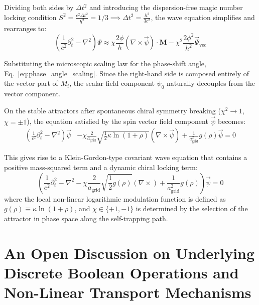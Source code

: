 \documentclass[12pt, a4paper]{article}
\begin{document}
Dividing both sides by $\Delta t^2$ and introducing the dispersion-free magic number locking condition $S^2 = \frac{c^2 \Delta t^2}{h^2} = 1/3 \implies \Delta t^2 = \frac{h^2}{3c^2}$, the wave equation simplifies and rearranges to:
\begin{equation}
\label{eq:simplified_wave_eq}
\left( \frac{1}{c^2} \partial_t^2 - \nabla^2 \right) \Psi \approx \chi \frac{2\phi}{h} \left( \nabla \times \vec{\psi} \right) \cdot \mathbf{M} - \chi^2 \frac{2\phi^2}{h^2} \vec{\Psi}_{\text{vec}}
\end{equation}

Substituting the microscopic scaling law for the phase-shift angle, Eq.~\eqref{eq:phase_angle_scaling}. Since the right-hand side is composed entirely of the vector part of $M_i$, the scalar field component $\psi_0$ naturally decouples from the vector component.

On the stable attractors after spontaneous chiral symmetry breaking ($\chi^2 \to 1$, $\chi = \pm 1$), the equation satisfied by the spin vector field component $\vec{\psi}$ becomes:
\begin{equation}
\label{eq:spin_vector_final}
\begin{split}
\left( \frac{1}{c^2} \partial_t^2 - \nabla^2 \right) \vec{\psi} &- \chi \frac{2}{a_{\text{grid}}} \sqrt{\frac{1}{2} \kappa \ln(1+\rho)} \left( \nabla \times \vec{\psi} \right) + \frac{1}{a_{\text{grid}}^2} g(\rho) \vec{\psi} = 0
\end{split}
\end{equation}

This gives rise to a Klein-Gordon-type covariant wave equation that contains a positive mass-squared term and a dynamic chiral locking term:
\begin{equation}
\label{eq:klein_gordon_emergent}
\left( \frac{1}{c^2} \partial_t^2 - \nabla^2 - \chi \frac{2}{a_{\text{grid}}} \sqrt{\frac{1}{2} g(\rho)} \left( \nabla \times \right) + \frac{1}{a_{\text{grid}}^2} g(\rho) \right) \vec{\psi} = 0
\end{equation}
where the local non-linear logarithmic modulation function is defined as $g(\rho) \equiv \kappa \ln(1+\rho)$, and $\chi \in \{+1, -1\}$ is determined by the selection of the attractor in phase space along the self-trapping path.

\section{An Open Discussion on Underlying Discrete Boolean Operations and Non-Linear Transport Mechanisms}
\end{document}
